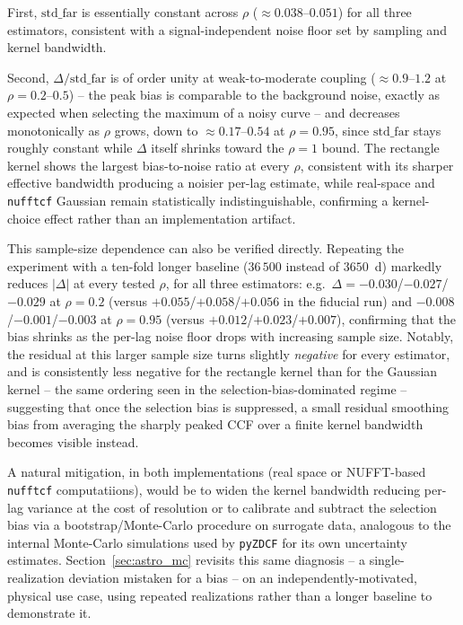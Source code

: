 \documentclass[twocolumn,10pt]{article}
\newcommand{\nufftcf}{\texttt{nufftcf}\xspace}
\newcommand{\pyzdcf}{\texttt{pyZDCF}\xspace}
\begin{document}
First, $\mathrm{std\_far}$ is essentially
constant across $\rho$ ($\approx0.038$--$0.051$) for all three estimators,
consistent with a signal-independent noise floor set by sampling and kernel
bandwidth. 


Second, $\Delta/\mathrm{std\_far}$ is of order unity at
weak-to-moderate coupling ($\approx0.9$--$1.2$ at $\rho=0.2$--$0.5$) -- the
peak bias is comparable to the background noise, exactly as expected when
selecting the maximum of a noisy curve -- and decreases monotonically as
$\rho$ grows, down to $\approx0.17$--$0.54$ at $\rho=0.95$, since
$\mathrm{std\_far}$ stays roughly constant while $\Delta$ itself shrinks
toward the $\rho=1$ bound. The rectangle kernel shows the largest
bias-to-noise ratio at every $\rho$, consistent with its sharper effective
bandwidth producing a noisier per-lag estimate, while real-space and
\texttt{nufftcf} Gaussian remain statistically indistinguishable, confirming
a kernel-choice effect rather than an implementation artifact.

This sample-size dependence can also be verified directly. Repeating the
experiment with a ten-fold longer baseline ($36\,500$ instead of $3650$~d)
markedly reduces $|\Delta|$ at every tested $\rho$, for all three
estimators: e.g.\ $\Delta=-0.030$/$-0.027$/$-0.029$ at $\rho=0.2$ (versus
$+0.055$/$+0.058$/$+0.056$ in the fiducial run) and $-0.008$/$-0.001$/$-0.003$
 at $\rho=0.95$ (versus $+0.012$/$+0.023$/$+0.007$), confirming that
the bias shrinks as the per-lag noise floor drops with increasing sample
size. Notably, the residual at this larger sample size turns slightly
\emph{negative} for every estimator, and is consistently less negative for
the rectangle kernel than for the Gaussian kernel -- the same ordering seen
in the selection-bias-dominated regime -- suggesting that once the selection
bias is suppressed, a small residual smoothing bias from averaging the
sharply peaked CCF over a finite kernel bandwidth becomes visible instead.

A natural mitigation, in both implementations (real space or NUFFT-based \nufftcf computatiions), 
would be to widen the kernel
bandwidth reducing per-lag variance at the cost of resolution or to
calibrate and subtract the selection bias via a bootstrap/Monte-Carlo
procedure on surrogate data, analogous to the internal Monte-Carlo
simulations used by \pyzdcf for its own uncertainty estimates. Section~\ref{sec:astro_mc}
revisits this same diagnosis -- a single-realization deviation mistaken for a
bias -- on an independently-motivated, physical use case, using repeated
realizations rather than a longer baseline to demonstrate it.
%
\end{document}
